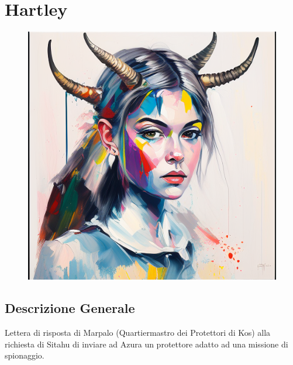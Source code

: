 \section{Hartley}\label{hartley}


\begin{figure}
\centering
\includegraphics{Hartley_autoritratto.png}
\end{figure}

\subsection{Descrizione Generale}\label{descrizione-generale}



Lettera di risposta di Marpalo (Quartiermastro dei Protettori di Kos)
alla richiesta di Sitahu di inviare ad Azura un protettore adatto ad una
missione di spionaggio.

